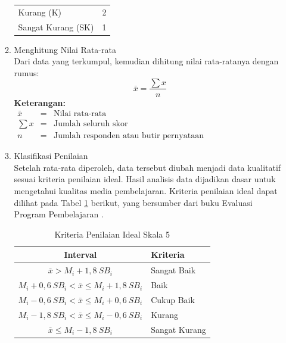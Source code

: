 \begin{enumerate}
\begin{enumerate}
\begin{table}[H]
\begin{tabular}{|p{5cm}|c|}
                Kurang (K) & 2\\
                Sangat Kurang (SK) & 1\\
                \hline
            \end{tabular}
        \end{table}
        \item Menghitung Nilai Rata-rata\\
        \hspace*{1cm}Dari data yang terkumpul, kemudian dihitung nilai rata-ratanya dengan rumus:
        \begin{equation}
            \bar{x}=\frac{\sum x}{n}
        \end{equation}
        \textbf{Keterangan:}\\
        \( \begin{array}{lcl}
            \bar{x} & = & \text{Nilai rata-rata}\\
            \sum x & = & \text{Jumlah seluruh skor}\\
            n & = & \text{Jumlah responden atau butir pernyataan}
        \end{array} \)
        \item Klasifikasi Penilaian\\
        \hspace*{1cm}Setelah rata-rata diperoleh, data tersebut diubah menjadi data kualitatif sesuai kriteria penilaian ideal. Hasil analisis data dijadikan dasar untuk mengetahui kualitas media pembelajaran. Kriteria penilaian ideal dapat dilihat pada Tabel \ref{kriteriaskala5} berikut, yang bersumber dari buku Evaluasi Program Pembelajaran \citep{widoyoko2014}.
        \begin{table}[H]
            \centering
            \caption{Kriteria Penilaian Ideal Skala 5}
            \label{kriteriaskala5}
            \begin{tabular}{|c|p{3cm}|}
                \hline
                \textbf{Interval} & \textbf{Kriteria}\\
                \hline
                \( \bar{x} > M_i + 1{,}8~SB_i \) & Sangat Baik\\
                \( M_i + 0{,}6~SB_i < \bar{x} \leq M_i + 1{,}8~SB_i \) & Baik\\
                \( M_i - 0{,}6~SB_i < \bar{x} \leq M_i + 0{,}6~SB_i  \) & Cukup Baik\\
                \( M_i - 1{,}8~SB_i < \bar{x} \leq M_i - 0{,}6~SB_i \) & Kurang\\
                \( \bar{x} \leq M_i - 1{,}8~SB_i \) & Sangat Kurang\\

\end{tabular}
\end{table}
\end{enumerate}
\end{enumerate}

